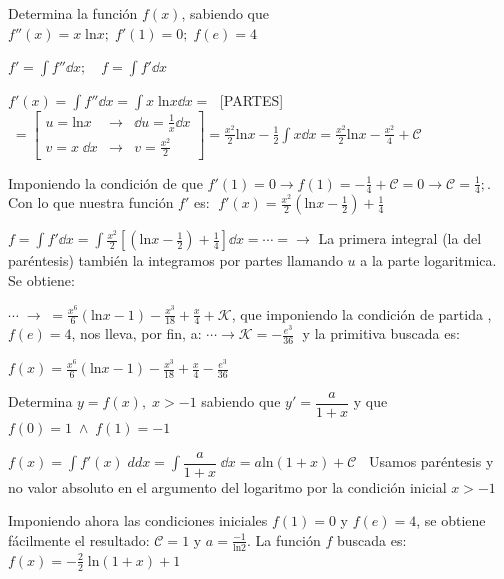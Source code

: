 {\begin{ejem}
Determina la función $f(x)$, sabiendo que $f''(x)=x\; \mathrm{ln} x; \; f'(1)=0; \; f(e)=4$	

\vspace{3mm} 

$ \displaystyle f'=\int f'' \dd x; \quad f = \int f' \dd x$  

$ f'(x) = \displaystyle \int f''  \dd x = \int x\; \mathrm{ln} x \dd x =\;  $ [PARTES] $\; = \left[ \begin{matrix} u= \mathrm{ln} x & \to &  \dd u = \frac 1 x \dd x\\ 
v=x\; \dd x & \to & v= \frac {x^2}{2} 
 \end{matrix} \right] = \frac {x^2}{2} \mathrm{ln} x - \frac 1 2 \int x \dd x = \frac {x^2}{2} \mathrm{ln} x  -\frac {x^2}{4} + \mathcal C $
 
 Imponiendo la condición de que $f'(1)=0 \to f(1)=-\frac 1 4 + \mathcal C =0 \to \mathcal C=\frac 1 4; $. Con lo que nuestra función $f'$ es:  $\; f'(x)= \frac {x^2}{2} \left(  \mathrm{ln} x  -\frac {1}{2}\right)+\frac 1 4 $ 
 
 $\displaystyle f = \int f' \dd x = \int \frac {x^2}{2}  \left[ \left(  \mathrm{ln} x  -\frac {1}{2}\right) + \frac 1 4 \right] \dd x = \cdots = \to $ La primera integral (la del paréntesis) también la integramos por partes llamando $u$ a la parte logaritmica. Se obtiene:
 
  $\cdots \; \to \; = \displaystyle \frac {x^6}{6} \left( \mathrm{ln} x - 1  \right) - \frac {x^3}{18} + \frac {x}{4} + \mathcal K$, que imponiendo la condición de partida , $f(e)=4$, nos lleva, por fin, a: $\cdots \to \mathcal K=-\frac {e^3}{36}\; $ y la primitiva buscada es:
  
  $f(x)= \displaystyle \frac {x^6}{6} \left( \mathrm{ln} x - 1  \right) - \frac {x^3}{18} + \frac {x}{4} - \frac {e^3}{36}$
\end{ejem}

\begin{ejem}
Determina $y=f(x), \; x>-1$ sabiendo que $y'=\dfrac {a}{1+x}$ y que $f(0)=1 \; \wedge \; f(1)=-1$	

\vspace{3mm} 

$\displaystyle f(x)=\int f'(x) \; dd x= \int \dfrac {a}{1+x} \; \dd x= a \mathrm{ln} (1+x)+\mathcal C\; \; $ \textcolor{gris}{Usamos paréntesis y no valor absoluto en el argumento del logaritmo por la condición inicial $x>-1$}


Imponiendo ahora las condiciones iniciales $f(1)=0$ y $f(e)=4$, se obtiene fácilmente el resultado: $\mathcal C=1$ y $a= \frac {-1}{\mathrm{ln}2}$. La función $f$ buscada es:
$f(x)=-\frac {2}{ \mathrm{2} }\; \mathrm {ln} (1+x) + 1$


\end{ejem}}
